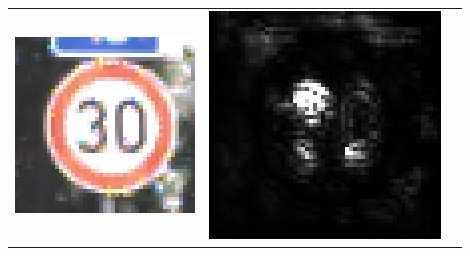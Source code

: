 \begin{table}
	\centering
	\begin{tabular}{p{4.5cm}p{4.5cm}p{4.5cm}}
		\includegraphics[width=\linewidth]{Images/AnPe/10771} & \includegraphics[width=\linewidth]{Images/AnPe/10771_guided} &

\end{tabular}
\end{table}
